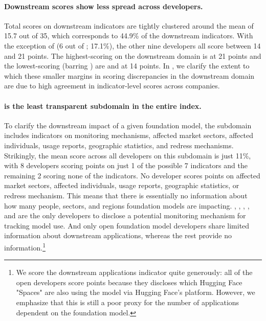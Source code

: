 \paragraph{Downstream scores show less spread across developers.}
Total scores on downstream indicators are tightly clustered around the mean of 15.7 out of 35, which corresponds to 44.9\% of the \numdownstreamindicators downstream indicators. 
With the exception of \amazon (6 out of \numdownstreamindicators; 17.1\%), the other nine developers all score between 14 and 21 points.
The highest-scoring on the downstream domain is \openai at 21 points and the lowest-scoring (barring \amazon) are \aitwentyone and \inflection at 14 points.
In , we clarify the extent to which these smaller margins in scoring discrepancies in the downstream domain are due to high agreement in indicator-level scores across companies.

\paragraph{\impact is the least transparent subdomain in the entire index.}
To clarify the downstream impact of a given foundation model, the \impact subdomain includes indicators on monitoring mechanisms, affected market sectors, affected individuals, usage reports, geographic statistics, and redress mechanisms.
Strikingly, the mean score across all developers on this subdomain is just 11\%, with 8 developers scoring points on just 1 of the possible 7 indicators and the remaining 2 scoring none of the indicators. 
No developer scores points on affected market sectors, affected individuals, usage reports, geographic statistics, or redress mechanism.
This means that there is essentially no information about how many people, sectors, and regions foundation models are impacting. 
\openai, \google, \cohere, \aitwentyone, and \inflection are the only developers to disclose a potential monitoring mechanism for tracking model use. 
And only open foundation model developers share limited information about downstream applications, whereas the rest provide no information.\footnote{We score the downstream applications indicator quite generously: all of the open developers score points because they discloses which Hugging Face "Spaces" are also using the model via Hugging Face's platform.
However, we emphasize that this is still a poor proxy for the number of applications dependent on the foundation model.} 

